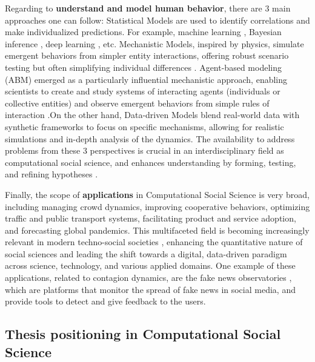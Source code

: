 Regarding to \textbf{understand and model human behavior}, there are 3 main approaches one can follow: Statistical Models are used to identify correlations and make individualized predictions. For example, machine learning \cite{murphy-2012}, Bayesian inference \cite{gelman1995bayesian}, deep learning \cite{goodfellow-2016}, etc. Mechanistic Models, inspired by physics, simulate emergent behaviors from simpler entity interactions, offering robust scenario testing but often simplifying individual differences \cite{axelrod2006agent}. Agent-based modeling (ABM) emerged as a particularly influential mechanistic approach, enabling scientists to create and study systems of interacting agents (individuals or collective entities) and observe emergent behaviors from simple rules of interaction \cite{epstein1999agent}.On the other hand, Data-driven Models blend real-world data with synthetic frameworks to focus on specific mechanisms, allowing for realistic simulations and in-depth analysis of the dynamics. The availability to address problems from these 3 perspectives is crucial in an interdisciplinary field as computational social science, and enhances understanding by forming, testing, and refining hypotheses \cite{watts2004new}.

Finally, the scope of \textbf{applications} in Computational Social Science is very broad, including managing crowd dynamics, improving cooperative behaviors, optimizing traffic and public transport systems, facilitating product and service adoption, and forecasting global pandemics. This multifaceted field is becoming increasingly relevant in modern techno-social societies \cite{vespignani2009predicting}, enhancing the quantitative nature of social sciences and leading the shift towards a digital, data-driven paradigm across science, technology, and various applied domains. One example of these applications, related to contagion dynamics, are the fake news observatories \cite{Polis-observatory, EDMO-observatory, committed-observatory-2023}, which are platforms that monitor the spread of fake news in social media, and provide tools to detect and give feedback to the users.

\subsection{Thesis positioning in Computational Social Science\label{subsec:Thesis positioning in Computational Social Science}}

